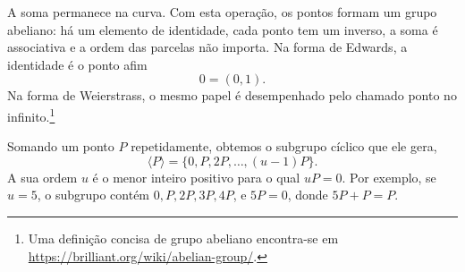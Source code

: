 A soma permanece na curva. Com esta operação, os pontos formam um grupo
abeliano:
 há um elemento de identidade, cada ponto tem um inverso, a soma é
associativa e a ordem das parcelas não importa. Na forma de Edwards, a
identidade é o ponto afim
\[
0=(0,1).
\]
Na forma de Weierstrass, o mesmo papel é desempenhado pelo chamado ponto no
infinito.\footnote{Uma definição concisa de grupo abeliano encontra-se em
\url{https://brilliant.org/wiki/abelian-group/}.}

Somando um ponto \(P\) repetidamente, obtemos o subgrupo cíclico que ele gera,
\[
\langle P\rangle=\{0,P,2P,\ldots,(u-1)P\}.
\]
A sua ordem \(u\) é o menor inteiro positivo para o qual \(uP=0\). Por
exemplo, se \(u=5\), o subgrupo contém \(0,P,2P,3P,4P\), e
\(5P=0\), donde \(5P+P=P\).

